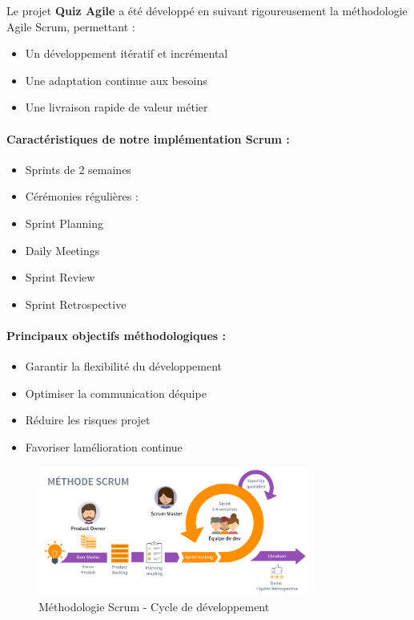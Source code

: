 \documentclass[12pt,a4paper,twoside]{report}
\begin{document}
Le projet \textbf{Quiz Agile} a été développé en suivant rigoureusement
la méthodologie Agile Scrum, permettant :

\begin{itemize}
\item
  Un développement itératif et incrémental
\item
  Une adaptation continue aux besoins
\item
  Une livraison rapide de valeur métier
\end{itemize}

\hypertarget{caractuxe9ristiques-de-notre-impluxe9mentation-scrum}{%
\paragraph{Caractéristiques de notre implémentation Scrum
:}\label{caractuxe9ristiques-de-notre-impluxe9mentation-scrum}}

\begin{itemize}
\item
  Sprints de 2 semaines
\item
  Cérémonies régulières :
\end{itemize}

\begin{itemize}
\item
  Sprint Planning
\item
  Daily Meetings
\item
  Sprint Review
\item
  Sprint Retrospective
\end{itemize}

\hypertarget{principaux-objectifs-muxe9thodologiques}{%
\paragraph{Principaux objectifs méthodologiques
:}\label{principaux-objectifs-muxe9thodologiques}}

\begin{itemize}
\item
  Garantir la flexibilité du développement
\item
  Optimiser la communication d\textquotesingle équipe
\item
  Réduire les risques projet
\item
  Favoriser l\textquotesingle amélioration continue
\end{itemize}

\begin{figure}[htbp]
    \centering
    \includegraphics[width=0.8\textwidth]{latex_media/media/image8.png}
    \caption{Méthodologie Scrum - Cycle de développement}
    \label{fig:cycle-scrum}
\end{figure}
\end{document}
